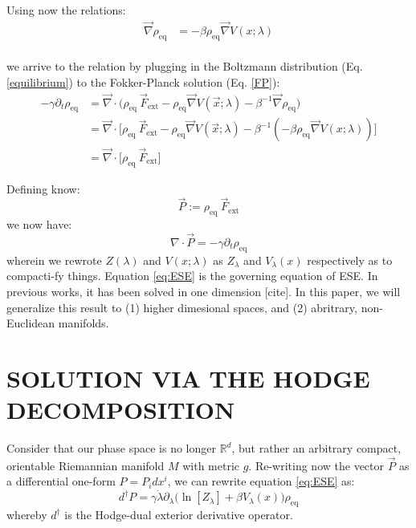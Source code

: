 \documentclass[%
 reprint,
 amsmath,amssymb,
 aps,
]{revtex4-2}
\begin{document}
Using now the relations:
\begin{align*}
   \vec{\nabla} \rho_\mathrm{eq} &= -\beta \rho_\mathrm{eq} \vec{\nabla} V(x; \lambda)
\end{align*}
\\
we arrive to the relation by plugging in the Boltzmann distribution (Eq. \ref{equilibrium}) to the Fokker-Planck solution (Eq. \ref{FP}):
\begin{align}
    -\gamma \partial_t \rho_\mathrm{eq} &= \vec{\nabla} \cdot \big( \rho_\mathrm{eq} \ \vec{F}_\mathrm{ext}  - \rho_\mathrm{eq} \vec{\nabla} V(\vec{x}; \lambda) - \beta^{-1} \vec{\nabla} \rho_\mathrm{eq} \big) \\
    &= \vec{\nabla} \cdot \big[  \rho_\mathrm{eq} \ \vec{F}_\mathrm{ext} - \rho_\mathrm{eq} \vec{\nabla} V(\vec{x}; \lambda) - \beta^{-1}( -\beta \rho_\mathrm{eq} \vec{\nabla} V(x; \lambda)) \big] \\
    &= \vec{\nabla} \cdot \big[ \rho_\mathrm{eq} \ \vec{F}_\mathrm{ext}\big]
\end{align}

Defining know:
\begin{equation}
    \vec{P} := \rho_\mathrm{eq} \ \vec{F}_\mathrm{ext}
\end{equation}
we now have:
\begin{equation} \label{eq:ESE}
    \nabla \cdot \vec{P} =  -\gamma \partial_t \rho_\mathrm{eq} %
\end{equation}
\noindent
wherein we rewrote $Z(\lambda)$ and $V(x; \lambda)$ as $Z_\lambda$ and $V_{\lambda}(x)$ respectively as to compacti-fy things. Equation \ref{eq:ESE} is the governing equation of ESE. In previous works, it has been solved in one dimension [cite]. In this paper, we will generalize this result to (1) higher dimesional spaces, and (2) abritrary, non-Euclidean manifolds.

\section{SOLUTION VIA THE HODGE DECOMPOSITION}

Consider that our phase space is no longer $\mathbb{R}^{d}$, but rather an arbitrary compact, orientable Riemannian manifold $M$ with metric $g$. Re-writing now the vector $\vec{P}$ as a differential one-form $P = P_i dx^{i}$, we can rewrite equation \ref{eq:ESE} as:
\begin{equation} \label{eq:ESEdiff}
  d^{\dagger} P = \gamma \dot{\lambda} \partial_{\lambda} \big( \ln[Z_{\lambda}]  + \beta V_{\lambda}(x) \big) \rho_\mathrm{eq}
\end{equation}
whereby $d^{\dagger}$ is the Hodge-dual exterior derivative operator.
\end{document}
